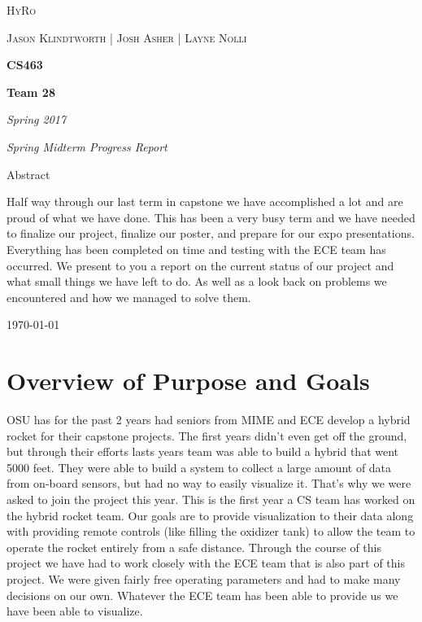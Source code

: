 \documentclass[10pt,draftclsnofoot,onecolumn]{IEEEtran}
\begin{document}
\begin{titlepage}
	\centering
	{\scshape\LARGE HyRo \par}
	\vspace{1cm}
	{\scshape\Large Jason Klindtworth  |  Josh Asher  |   Layne Nolli\par}
	\vspace{1.5cm}
	{\huge\bfseries CS463\par}
	\vspace{2cm}
	{\huge\bfseries Team 28\par}
	\vspace{2cm}
	{\Large\itshape Spring 2017\par}
	\vspace{4cm}
	{\Large\itshape Spring Midterm Progress Report\par}
	\vspace{4cm}
	{\large Abstract\par}
	\vspace{1cm}
	Half way through our last term in capstone we have accomplished a lot and are proud of what we have done. This has been a very busy term and we have
	needed to finalize our project, finalize our poster, and prepare for our expo presentations. Everything has been completed on time and testing with the ECE team has occurred. We present to you a report on the current status of our project and what small things we have left to do. As well as a look back on problems we encountered and how we managed to solve them.\par

	\vfill

	{\large \today\par}
\end{titlepage}


\section{Overview of Purpose and Goals}
OSU has for the past 2 years had seniors from MIME and ECE develop a hybrid rocket for their capstone projects. The first years didn't even get off the ground, but through their efforts lasts years team was able to build a hybrid that went 5000 feet. They were able to build a system to collect a large amount of data from on-board sensors, but had no way to easily visualize it. That's why we were asked to join the project this year. This is the first year a CS team has worked on the hybrid rocket team. Our goals are to provide visualization to their data along with providing remote controls (like filling the oxidizer tank) to allow the team to operate the rocket entirely from a safe distance. Through the course of this project we have had to work closely with the ECE team that is also part of this project. We were given fairly free operating parameters and had to make many decisions on our own. Whatever the ECE team has been able to provide us we have been able to visualize. \par
\end{document}
